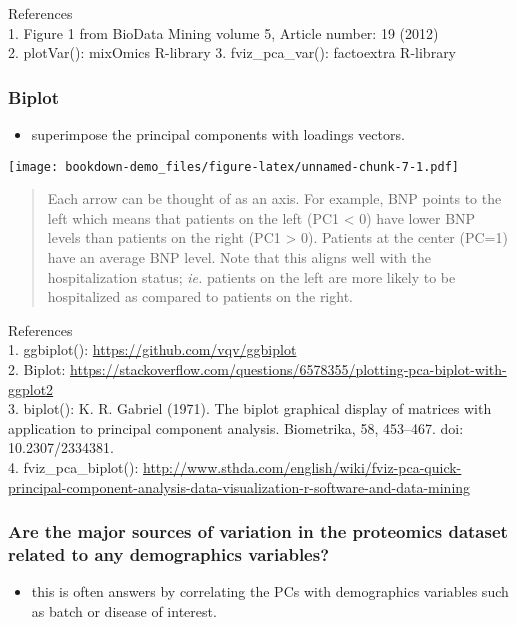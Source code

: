 \documentclass[]{book}
\providecommand{\tightlist}{%
  \setlength{\itemsep}{0pt}\setlength{\parskip}{0pt}}
\begin{document}
References\\
1. Figure 1 from BioData Mining volume 5, Article number: 19 (2012)\\
2. plotVar(): mixOmics R-library 3. fviz\_pca\_var(): factoextra
R-library

\subsubsection{Biplot}\label{biplot}

\begin{itemize}
\tightlist
\item
  superimpose the principal components with loadings vectors.
\end{itemize}

\texttt{[image: bookdown-demo\_files/figure-latex/unnamed-chunk-7-1.pdf]}

\begin{quote}
Each arrow can be thought of as an axis. For example, BNP points to the
left which means that patients on the left (PC1 \textless{} 0) have
lower BNP levels than patients on the right (PC1 \textgreater{} 0).
Patients at the center (PC=1) have an average BNP level. Note that this
aligns well with the hospitalization status; \emph{ie.} patients on the
left are more likely to be hospitalized as compared to patients on the
right.
\end{quote}

References\\
1. ggbiplot(): \url{https://github.com/vqv/ggbiplot}\\
2. Biplot:
\url{https://stackoverflow.com/questions/6578355/plotting-pca-biplot-with-ggplot2}\\
3. biplot(): K. R. Gabriel (1971). The biplot graphical display of
matrices with application to principal component analysis. Biometrika,
58, 453--467. doi: 10.2307/2334381.\\
4. fviz\_pca\_biplot():
\url{http://www.sthda.com/english/wiki/fviz-pca-quick-principal-component-analysis-data-visualization-r-software-and-data-mining}

\subsubsection{Are the major sources of variation in the proteomics
dataset related to any demographics
variables?}\label{are-the-major-sources-of-variation-in-the-proteomics-dataset-related-to-any-demographics-variables}

\begin{itemize}
\tightlist
\item
  this is often answers by correlating the PCs with demographics
  variables such as batch or disease of interest.
\end{itemize}
\end{document}
